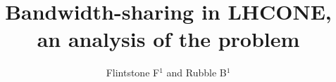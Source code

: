 \documentclass[a4paper]{jpconf}
\begin{document}
\title{Bandwidth-sharing in LHCONE, an analysis of the problem}

\author{Flintstone F$^1$ and Rubble B$^1$}

\address{$^1$ Bedrock}




% 
% 
% 

\par

\end{document}

